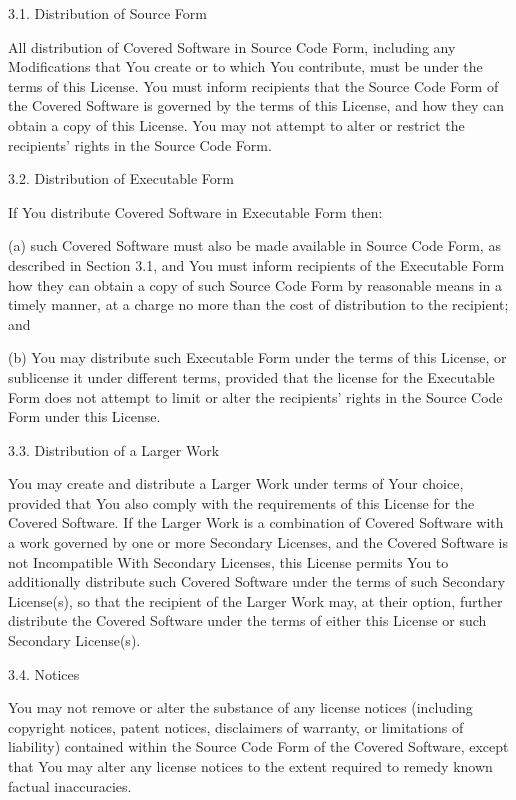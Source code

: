 3.1. Distribution of Source Form

All distribution of Covered Software in Source Code Form, including any
Modifications that You create or to which You contribute, must be under
the terms of this License. You must inform recipients that the Source
Code Form of the Covered Software is governed by the terms of this
License, and how they can obtain a copy of this License. You may not
attempt to alter or restrict the recipients' rights in the Source Code
Form.

3.2. Distribution of Executable Form

If You distribute Covered Software in Executable Form then:

(a) such Covered Software must also be made available in Source Code
    Form, as described in Section 3.1, and You must inform recipients of
    the Executable Form how they can obtain a copy of such Source Code
    Form by reasonable means in a timely manner, at a charge no more
    than the cost of distribution to the recipient; and

(b) You may distribute such Executable Form under the terms of this
    License, or sublicense it under different terms, provided that the
    license for the Executable Form does not attempt to limit or alter
    the recipients' rights in the Source Code Form under this License.

3.3. Distribution of a Larger Work

You may create and distribute a Larger Work under terms of Your choice,
provided that You also comply with the requirements of this License for
the Covered Software. If the Larger Work is a combination of Covered
Software with a work governed by one or more Secondary Licenses, and the
Covered Software is not Incompatible With Secondary Licenses, this
License permits You to additionally distribute such Covered Software
under the terms of such Secondary License(s), so that the recipient of
the Larger Work may, at their option, further distribute the Covered
Software under the terms of either this License or such Secondary
License(s).

3.4. Notices

You may not remove or alter the substance of any license notices
(including copyright notices, patent notices, disclaimers of warranty,
or limitations of liability) contained within the Source Code Form of
the Covered Software, except that You may alter any license notices to
the extent required to remedy known factual inaccuracies.

